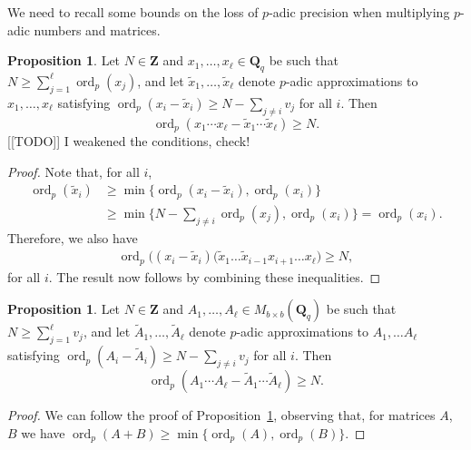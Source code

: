 \documentclass[a4paper,11pt]{article}
\numberwithin{equation}{section}
\newcommand{\QQ}{\mathbf{Q}} %
\DeclareMathOperator{\ord}{ord}          %
\theoremstyle{definition}
\newtheorem{prop}[thm]{Proposition}
\begin{document}
We need to recall some bounds on the loss of $p$-adic precision when
multiplying $p$-adic numbers and matrices.


\begin{prop} \label{prop:productval}
Let $N \in \mathbf{Z}$ and $x_1, \dotsc, x_{\ell} \in \mathbf{Q}_q$  
be such that $N \geq \sum_{j=1}^{\ell} \ord_p(x_j)$, and let 
$\tilde{x}_1, \dotsc, \tilde{x}_{\ell}$ denote $p$-adic approximations to 
$x_1, \dotsc, x_{\ell}$ satisfying $\ord_p(x_i - \tilde{x}_i) \geq N - \sum_{j \neq i} v_j$ 
for all $i$.  Then 
\begin{equation*}
\ord_p(x_1 \dotsm x_{\ell} - \tilde{x}_1 \dotsm \tilde{x}_{\ell}) \geq N.
\end{equation*}
[[TODO]] I weakened the conditions, check!
\end{prop}

\begin{proof}
Note that, for all $i$,
\begin{align*}
\ord_p(\tilde{x}_i) &\geq \min \{ \ord_p(x_i-\tilde{x}_i), \ord_p(x_i) \} \\
                    &\geq \min \{ N- \sum_{j \neq i} \ord_p(x_j), \ord_p(x_i)\} = \ord_p(x_i).
\end{align*}
Therefore, we also have
\begin{align*}
\ord_p \bigl( (x_{i}-\tilde{x}_{i})(\tilde{x}_1 \dotsc \tilde{x}_{i-1} x_{i+1} \dotsc x_{\ell} \bigr) \geq N,
\end{align*}
for all $i$. The result now follows by combining these inequalities.
\end{proof}

\begin{prop} \label{prop:matrixproductval}
Let $N \in \mathbf{Z}$ and $A_1, \dotsc, A_{\ell} \in M_{b \times b}(\QQ_q)$
be such that $N \geq \sum_{j=1}^{\ell} v_j$, and let
$\tilde{A}_1, \dotsc, \tilde{A}_{\ell}$ denote $p$-adic approximations 
to $A_1, \dotsc A_{\ell}$ satisfying $\ord_p(A_i - \tilde{A}_i) \geq N - \sum_{j \neq i} v_j$ 
for all $i$.  Then 
\begin{equation}
\ord_p(A_1 \dotsm A_{\ell} - \tilde{A}_1 \dotsm \tilde{A}_{\ell}) \geq N.
\end{equation}
\end{prop}

\begin{proof}
We can follow the proof of Proposition~\ref{prop:productval}, 
observing that, for matrices $A$, $B$ we have 
$\ord_p(A + B) \geq \min \{\ord_p(A), \ord_p(B)\}$.
\end{proof}
\end{document}
